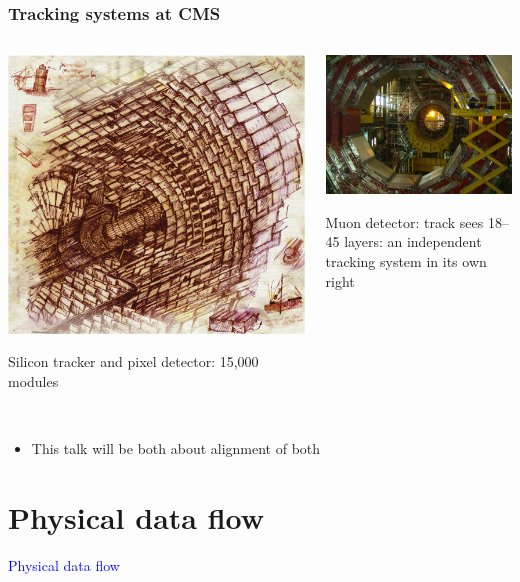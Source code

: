 \documentclass[compress]{beamer}
\begin{document}
\begin{frame}
\frametitle{Tracking systems at CMS}
\begin{columns}
\begin{center}
\includegraphics[height=3.5 cm]{tracker_leo.png}

Silicon tracker and pixel detector: 15,000 modules \\ \mbox{ }
\end{center}

\begin{center}
\includegraphics[height=3.5 cm]{sun_shines_in_the_detector.jpg}

Muon detector: track sees 18--45 layers: an independent tracking system in its own right
\end{center}
\end{columns}

\vfill
\begin{itemize}
\item<2-> This talk will be both about alignment of both
\end{itemize}
\end{frame}

\section*{Physical data flow}

\begin{frame}
\begin{center}
\Huge \textcolor{blue}{Physical data flow}
\end{center}
\end{frame}
\end{document}
